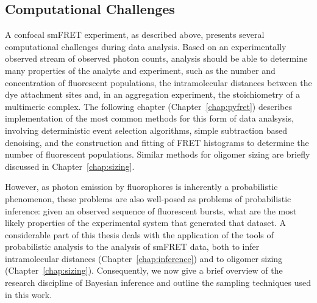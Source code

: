 


\subsection{Computational Challenges}
A confocal smFRET experiment, as described above, presents several computational challenges during data analysis. Based on an experimentally observed stream of observed photon counts, analysis should be able to determine many properties of the analyte and experiment, such as the number and concentration of fluorescent populations, the intramolecular distances between the dye attachment sites and, in an aggregation experiment, the stoichiometry of a multimeric complex. The following chapter (Chapter~\ref{chap:pyfret}) describes implementation of the most common methods for this form of data analsysis, involving deterministic event selection algorithms, simple subtraction based denoising, and the construction and fitting of FRET histograms to determine the number of fluorescent populations. Similar methods for oligomer sizing are briefly discussed in Chapter~\ref{chap:sizing}. 

However, as photon emission by fluorophores is inherently a probabilistic phenomenon, these problems are also well-posed as problems of probabilistic inference: given an observed sequence of fluorescent bursts, what are the most likely properties of the experimental system that generated that dataset. A considerable part of this thesis deals with the application of the tools of probabilistic analysis to the analysis of smFRET data, both to infer intramolecular distances (Chapter~\ref{chap:inference}) and to oligomer sizing (Chapter~\ref{chap:sizing}). Consequently, we now give a brief overview of the research discipline of Bayesian inference and outline the sampling techniques used in this work.  

